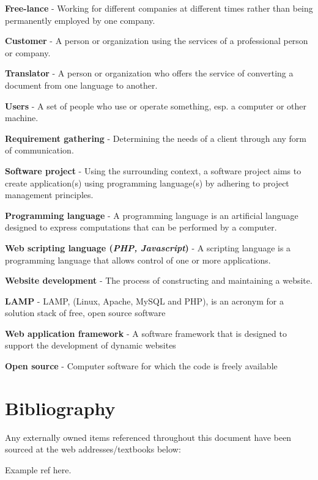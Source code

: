 \documentclass{l3proj}
\begin{document}
\begin{itemize}
\small{
\item{\textbf{Free-lance} - Working for different companies at different times rather than being permanently employed by one company.} 
\item{\textbf{Customer} - A person or organization using the services of a professional person or company.}
\item{\textbf{Translator} - A person or organization who offers the service of converting a document from one language to another.}
\item{\textbf{Users} - A set of people who use or operate something, esp. a computer or other machine.}
\item{\textbf{Requirement gathering} - Determining the needs of a client through any form of communication.}
\item{\textbf{Software project} - Using the surrounding context, a software project aims to create application(s) using programming language(s) by adhering
to project management principles.}
\item{\textbf{Programming language} - A programming language is an artificial
language designed to express computations that can be performed by a computer.} \item{\textbf{Web scripting language (\textit{PHP, Javascript})} - A scripting language is a programming language that allows control of one or more
applications.}
\item{\textbf{Website development} - The process of constructing and maintaining a website.}
\item{\textbf{LAMP} - LAMP, (Linux, Apache, MySQL and PHP), is an acronym for a solution stack of free, open source software}
\item{\textbf{Web application framework} - A software framework that is designed to support the development of dynamic websites }
\item{\textbf{Open source} - Computer software for which the code is freely available }
}
\end{itemize}
\chapter{Bibliography}
\label{chap:bibl}
Any externally owned items referenced throughout this document have been sourced
at the web addresses/textbooks below:
\begin{itemize}
\small{
\item Example ref here.
}
\end{itemize}
\end{document}
